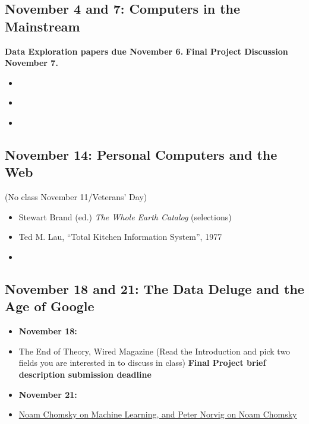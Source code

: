 \subsection{November 4 and 7: Computers in the
Mainstream}\label{november-4-and-7-computers-in-the-mainstream}

\textbf{Data Exploration papers due November 6.} \textbf{Final Project
Discussion November 7.}

\begin{itemize}
\itemsep1pt\parskip0pt
\item
  \cite{lubar_not_1992}
\item
  \cite[Selections]{miller_assault_1971}
\item
  \cite{kidder_soul_1981}
\end{itemize}

\subsection{November 14: Personal Computers and the
Web}\label{november-14-personal-computers-and-the-web}

(No class November 11/Veterans' Day)

\begin{itemize}
\itemsep1pt\parskip0pt
\item
  Stewart Brand (ed.) \emph{The Whole Earth Catalog} (selections)
\item
  Ted M. Lau, ``Total Kitchen Information System'', 1977
\item
  \cite[Introduction; Chapters 1, 2, and 3]{berners-lee_weaving_1999}
\end{itemize}

\subsection{November 18 and 21: The Data Deluge and the Age of
Google}\label{november-18-and-21-the-data-deluge-and-the-age-of-google}

\begin{itemize}
\item
  \textbf{November 18:}
  \cite["After the Deluge"]{gleick_information:_2011}
\item
  The End of Theory, Wired Magazine (Read the Introduction and pick two
  fields you are interested in to discuss in class) \textbf{Final
  Project brief description submission deadline}
\item
  \textbf{November 21:}
  \cite[Chapter 2]{vaidhyanathan_googlization_2011}
\item
  \href{http://norvig.com/chomsky.html}{Noam Chomsky on Machine
  Learning, and Peter Norvig on Noam Chomsky}
\end{itemize}

